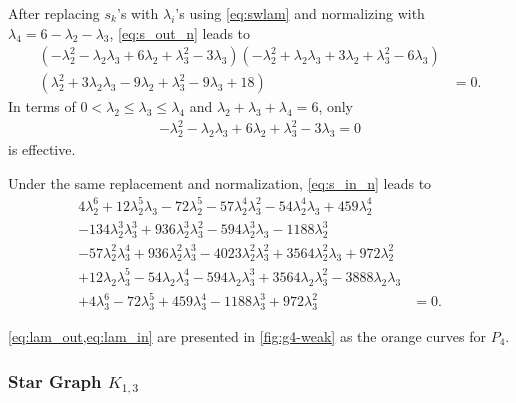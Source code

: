 \documentclass{article}
\theoremstyle{definition}
\begin{document}
After replacing $s_k$'s with $\lambda_i$'s using \cref{eq:swlam} and normalizing with $\lambda_4 = 6 - \lambda_2 - \lambda_3$, \cref{eq:s_out_n} leads to
\begin{equation}
\label{eq:lam_out_all}
\begin{aligned}
    (-\lambda_2^2 - \lambda_2\lambda_3 + 6\lambda_2 + \lambda_3^2 - 3\lambda_3)
    (-\lambda_2^2 + \lambda_2\lambda_3 + 3\lambda_2 + \lambda_3^2 - 6\lambda_3) & \\
    (\lambda_2^2 + 3\lambda_2\lambda_3 - 9\lambda_2 + \lambda_3^2 - 9\lambda_3 + 18) &= 0.
\end{aligned}
\end{equation}
In terms of $0 < \lambda_2 \leq \lambda_3 \leq \lambda_4$ and $\lambda_2 + \lambda_3 + \lambda_4 = 6$, only 
\begin{equation}
\label{eq:lam_out}
\begin{split}
    -\lambda_2^2 - \lambda_2\lambda_3 + 6\lambda_2 + \lambda_3^2 - 3\lambda_3 = 0
\end{split}
\end{equation}
is effective.

Under the same replacement and normalization, \cref{eq:s_in_n} leads to 
\begin{equation}
\label{eq:lam_in}
\begin{aligned}
    4\lambda_2^6 + 12\lambda_2^5\lambda_3 - 72\lambda_2^5 - 57\lambda_2^4\lambda_3^2 - 54\lambda_2^4\lambda_3 + 459\lambda_2^4 & \\
    - 134\lambda_2^3\lambda_3^3 + 936\lambda_2^3\lambda_3^2 - 594\lambda_2^3\lambda_3 - 1188\lambda_2^3 & \\
    - 57\lambda_2^2\lambda_3^4 + 936\lambda_2^2\lambda_3^3 - 4023\lambda_2^2\lambda_3^2 + 3564\lambda_2^2\lambda_3 + 972\lambda_2^2 & \\
    + 12\lambda_2\lambda_3^5 - 54\lambda_2\lambda_3^4 - 594\lambda_2\lambda_3^3 + 3564\lambda_2\lambda_3^2 - 3888\lambda_2\lambda_3 & \\
    + 4\lambda_3^6 - 72\lambda_3^5 + 459\lambda_3^4 - 1188\lambda_3^3 + 972\lambda_3^2 &= 0.
\end{aligned}
\end{equation}

\cref{eq:lam_out,eq:lam_in} are presented in \cref{fig:g4-weak} as the orange curves for $P_4$.

\subsubsection{Star Graph \texorpdfstring{$K_{1,3}$}{K13}}
\end{document}
